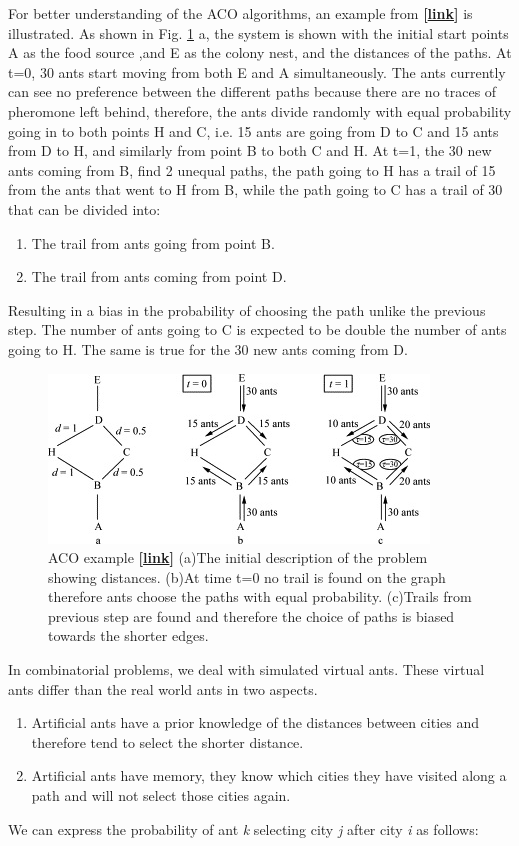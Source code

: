 \documentclass[twocolumn]{article}
\begin{document}
	For better understanding of the ACO algorithms, an example from \textbf{[\underline{link}]} is illustrated. As shown in Fig.  \ref{fig:ACOexample} a, the system is shown with the initial start points A as the food source ,and E as the colony nest, and the distances of the paths. At t=0, 30 ants start moving from both E and A simultaneously. The ants currently can see no preference between the different paths because there are no traces of pheromone left behind, therefore, the ants divide randomly with equal probability going in to both points H and C, i.e. 15 ants are going from D to C and 15 ants from D to H, and similarly from point B to both C and H. At t=1, the 30 new ants coming from B, find 2 unequal paths, the path going to H has a trail of 15 from the ants that went to H from B, while the path going to C has a trail of 30 that can be divided into:
	\begin{enumerate}
		\item The trail from ants going from point B.
		\item The trail from ants coming from point D.
	\end{enumerate}
	 Resulting in a bias in the probability of choosing the path unlike the previous step. The number of ants going to C is expected to be double the number of ants going to H. The same is true for the 30 new ants coming from D.
	\begin{figure}[h!]
		\centering
		\includegraphics[scale=0.6]{./ACOexample.jpg}
		\caption{ACO example \textbf{[\underline{link}]} (a)The initial description of the problem showing distances. (b)At time t=0 no trail is found on the graph therefore ants choose the paths with equal probability. (c)Trails from previous step are found and therefore the choice of paths is biased towards the shorter edges.}
		\label{fig:ACOexample}
	\end{figure}
	
	In combinatorial problems, we deal with simulated virtual ants. These virtual ants differ than the real world ants in two aspects.
	\begin{enumerate}
		\item Artificial ants have a prior knowledge of the distances between cities and therefore tend to select the shorter distance.
		\item Artificial ants have memory, they know which cities they have visited along a path and will not select those cities again.
	\end{enumerate}
	We can express the probability of ant \textit{k} selecting city \textit{j} after city \textit{i} as follows:
	
\end{document}

